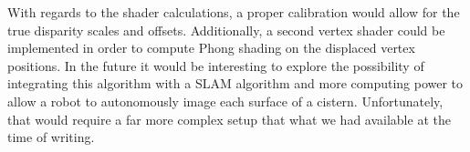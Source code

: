 \documentclass[a4paper,twoside]{article}
\begin{document}
With regards to the shader calculations, a proper calibration would allow for the true disparity scales and offsets. 
Additionally, a second vertex shader could be implemented in order to compute Phong shading on the displaced vertex positions.
In the future it would be interesting to explore the possibility of integrating this algorithm with a SLAM algorithm and more computing power to allow a robot to autonomously image each surface of a cistern. 
Unfortunately, that would require a far more complex setup that what we had available at the time of writing.




\end{document}
